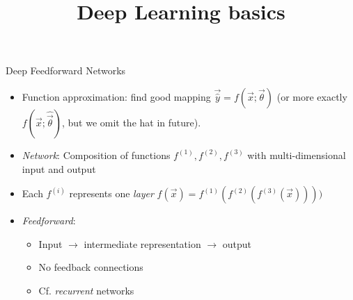 



\newcommand{\learninggoals}{
\item High level understanding of feed forward networks,
\item and the role and choices of activations}

\title{Deep Learning basics}
\date{}




\begin{vbframe}{Deep Feedforward Networks}

\vfill

\begin{itemize}
\item Function approximation: find good mapping $\vec{\hat y} = f(\vec x; \vec \theta)$ (or more exactly $f(\vec x; \hat{\vec \theta})$,
     but we omit the hat in future).
\item \emph{Network}: Composition of functions $f^{(1)}, f^{(2)},f^{(3)}$ with multi-dimensional input and output
\item Each $f^{(i)}$ represents one \emph{layer}
$f(\vec x) = f^{(1)}( f^{(2)}(f^{(3)}(\vec x))))$

\item \emph{Feedforward}: 

\begin{itemize}
\item Input $\rightarrow$ intermediate representation $\rightarrow$ output
\item No feedback connections
\item Cf. \emph{recurrent} networks
\end{itemize}
\end{itemize}
\begin{center}
\end{center}

\vfill

\end{vbframe}



